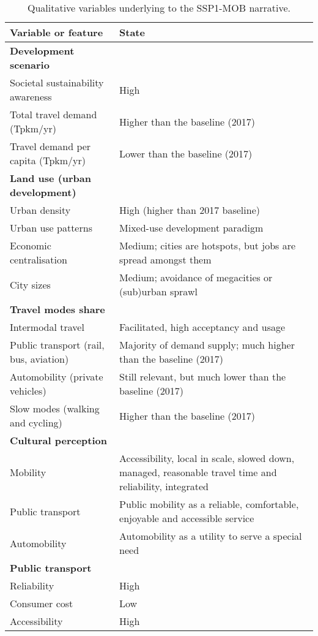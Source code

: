 \begin{table}
\centering
\caption[SSP1-MOB qualitative variables]{Qualitative variables underlying to the SSP1-MOB narrative.}
\label{t:ssp1-mob-2100-narrative-thesis}
\footnotesize
\begin{tabular}{p{5cm}p{9cm}}
\toprule
Variable or feature & State \\ \midrule
\textbf{Development scenario} &  \\
Societal sustainability awareness & High \\
Total travel demand (Tpkm/yr) & Higher than the baseline (2017) \\
Travel demand per capita (Tpkm/yr) & Lower than the baseline (2017) \\ \addlinespace
\textbf{Land use (urban development)} &  \\
Urban density & High (higher than 2017 baseline) \\
Urban use patterns & Mixed-use development paradigm \\
Economic centralisation & Medium; cities are hotspots, but jobs are spread amongst them \\
City sizes & Medium; avoidance of megacities or (sub)urban sprawl \\\addlinespace
\textbf{Travel modes share} &  \\
Intermodal travel & Facilitated, high acceptancy and usage \\
Public transport (rail, bus, aviation) & Majority of demand supply; much higher than the baseline (2017) \\
Automobility (private vehicles) & Still relevant, but much lower than the baseline (2017) \\
Slow modes (walking and cycling) & Higher than the baseline (2017) \\\addlinespace
\textbf{Cultural perception} &  \\
Mobility & Accessibility, local in scale, slowed down, managed, reasonable travel time and reliability, integrated \\
Public transport & Public mobility as a reliable, comfortable, enjoyable and accessible service \\
Automobility & Automobility as a utility to serve a special need \\\addlinespace
\textbf{Public transport} &  \\
Reliability & High \\
Consumer cost & Low \\
Accessibility & High \\

\end{tabular}
\end{table}
